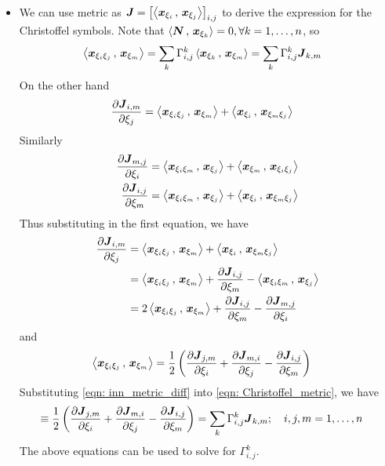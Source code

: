 \documentclass[11pt]{article}
\begin{document}
\begin{itemize}
\item We can use metric as $\boldsymbol{J} = \left[\left\langle \boldsymbol{x}_{\xi_{i}}\,,\, \boldsymbol{x}_{\xi_{j}} \right\rangle\right]_{i,j}$ to derive the expression for the Christoffel symbols. Note that $\left\langle \boldsymbol{N}\,,\, \boldsymbol{x}_{\xi_{k}} \right\rangle = 0,\forall k=1,\ldots, n$, so 
\begin{align}
\left\langle \boldsymbol{x}_{\xi_{i}\xi_{j}}\,,\, \boldsymbol{x}_{\xi_{m}} \right\rangle &= \sum_{k}\Gamma_{i,j}^{k}\left\langle \boldsymbol{x}_{\xi_{k}}\,,\, \boldsymbol{x}_{\xi_{m}} \right\rangle = \sum_{k}\Gamma_{i,j}^{k}\boldsymbol{J}_{k,m} \label{eqn: Christoffel_metric}
\end{align} 
On the other hand
\begin{align*}
\frac{\partial \boldsymbol{J}_{i,m}}{ \partial \xi_{j}} &= \left\langle \boldsymbol{x}_{\xi_{i}\xi_{j}}\,,\, \boldsymbol{x}_{\xi_{m}} \right\rangle + \left\langle \boldsymbol{x}_{\xi_{i}}\,,\, \boldsymbol{x}_{\xi_{m}\xi_{j}} \right\rangle 
\end{align*}
Similarly
\begin{align*}
\frac{\partial \boldsymbol{J}_{m,j}}{ \partial \xi_{i}} &= \left\langle \boldsymbol{x}_{\xi_{i}\xi_{m}}\,,\, \boldsymbol{x}_{\xi_{j}} \right\rangle + \left\langle \boldsymbol{x}_{\xi_{m}}\,,\, \boldsymbol{x}_{\xi_{i}\xi_{j}} \right\rangle \\
\frac{\partial \boldsymbol{J}_{i,j}}{ \partial \xi_{m}} &= \left\langle \boldsymbol{x}_{\xi_{i}\xi_{m}}\,,\, \boldsymbol{x}_{\xi_{j}} \right\rangle + \left\langle \boldsymbol{x}_{\xi_{i}}\,,\, \boldsymbol{x}_{\xi_{m}\xi_{j}} \right\rangle 
\end{align*}
Thus substituting in the first equation, we have
\begin{align*}
\frac{\partial \boldsymbol{J}_{i,m}}{ \partial \xi_{j}} &= \left\langle \boldsymbol{x}_{\xi_{i}\xi_{j}}\,,\, \boldsymbol{x}_{\xi_{m}} \right\rangle + \left\langle \boldsymbol{x}_{\xi_{i}}\,,\, \boldsymbol{x}_{\xi_{m}\xi_{j}} \right\rangle \\
&= \left\langle \boldsymbol{x}_{\xi_{i}\xi_{j}}\,,\, \boldsymbol{x}_{\xi_{m}} \right\rangle +\frac{\partial \boldsymbol{J}_{i,j}}{ \partial \xi_{m}}- \left\langle \boldsymbol{x}_{\xi_{i}\xi_{m}}\,,\, \boldsymbol{x}_{\xi_{j}} \right\rangle \\
&=  2\left\langle \boldsymbol{x}_{\xi_{i}\xi_{j}}\,,\, \boldsymbol{x}_{\xi_{m}} \right\rangle +\frac{\partial \boldsymbol{J}_{i,j}}{ \partial \xi_{m}}- \frac{\partial \boldsymbol{J}_{m,j}}{ \partial \xi_{i}}
\end{align*}
and 
\begin{align}
\left\langle \boldsymbol{x}_{\xi_{i}\xi_{j}}\,,\, \boldsymbol{x}_{\xi_{m}} \right\rangle &= \frac{1}{2}\left(\frac{\partial \boldsymbol{J}_{j,m}}{ \partial \xi_{i}}+ \frac{\partial \boldsymbol{J}_{m,i}}{ \partial \xi_{j}}  - \frac{\partial \boldsymbol{J}_{i,j}}{ \partial \xi_{m}}\right) \label{eqn: inn_metric_diff}
\end{align}
Substituting \eqref{eqn: inn_metric_diff} into \eqref{eqn: Christoffel_metric}, we have
\begin{align}
 [ij,m]\equiv \frac{1}{2}\paren{\partdiff{\mb{J}_{j,m}}{\xi_{i}}+ \partdiff{\mb{J}_{m,i}}{\xi_{j}}  - \partdiff{\mb{J}_{i,j}}{\xi_{m}}}
 &= \sum_{k}\Gamma_{i,j}^{k}\mb{J}_{k,m};\quad  i,j,m=1,\ldots, n\label{eqn: metric_diff_eqn}
\end{align}
The above equations can be used to solve for $\Gamma_{i,j}^{k}$.


\end{itemize}
\end{document}
